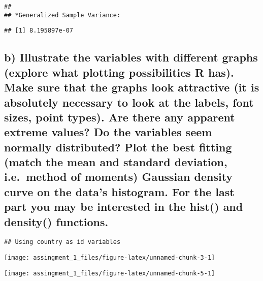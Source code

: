 \documentclass[]{article}
\begin{document}
\begin{verbatim}
## 
## *Generalized Sample Variance:
\end{verbatim}

\begin{verbatim}
## [1] 8.195897e-07
\end{verbatim}

\hypertarget{b-illustrate-the-variables-with-different-graphs-explore-what-plotting-possibilities-r-has.-make-sure-that-the-graphs-look-attractive-it-is-absolutely-necessary-to-look-at-the-labels-font-sizes-point-types.-are-there-any-apparent-extreme-values-do-the-variables-seem-normally-distributed-plot-the-best-fitting-match-the-mean-and-standard-deviation-i.e.-method-of-moments-gaussian-density-curve-on-the-datas-histogram.-for-the-last-part-you-may-be-interested-in-the-hist-and-density-functions.}{%
\subsection{b) Illustrate the variables with different graphs (explore
what plotting possibilities R has). Make sure that the graphs look
attractive (it is absolutely necessary to look at the labels, font
sizes, point types). Are there any apparent extreme values? Do the
variables seem normally distributed? Plot the best fitting (match the
mean and standard deviation, i.e.~method of moments) Gaussian density
curve on the data's histogram. For the last part you may be interested
in the hist() and density()
functions.}\label{b-illustrate-the-variables-with-different-graphs-explore-what-plotting-possibilities-r-has.-make-sure-that-the-graphs-look-attractive-it-is-absolutely-necessary-to-look-at-the-labels-font-sizes-point-types.-are-there-any-apparent-extreme-values-do-the-variables-seem-normally-distributed-plot-the-best-fitting-match-the-mean-and-standard-deviation-i.e.-method-of-moments-gaussian-density-curve-on-the-datas-histogram.-for-the-last-part-you-may-be-interested-in-the-hist-and-density-functions.}}

\begin{verbatim}
## Using country as id variables
\end{verbatim}

\begin{center}\texttt{[image: assingment\_1\_files/figure-latex/unnamed-chunk-3-1]} \end{center}

\begin{center}\texttt{[image: assingment\_1\_files/figure-latex/unnamed-chunk-5-1]} \end{center}
\end{document}
